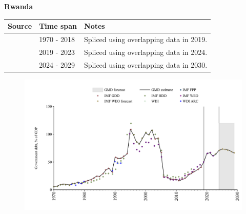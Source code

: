 \documentclass[12pt,a4paper,landscape]{article}
\begin{document}
\begin{adjustbox}{max totalsize={\paperwidth}{\paperheight},center}
\begin{minipage}[t][\textheight][t]{\textwidth}
\vspace*{0.5cm}
{}
\begin{center}
{\Large\bfseries Rwanda}
\end{center}
\vspace{0.5cm}
\begin{table}[H]
\centering
\small
\begin{tabular}{|l|l|l|}
\hline
\textbf{Source} & \textbf{Time span} & \textbf{Notes} \\
\hline
\rowcolor{white}\cite{IMF_GDD}& 1970 - 2018 &Spliced using overlapping data in 2019.\\
\rowcolor{lightgray}\cite{IMF_FPP}& 2019 - 2023 &Spliced using overlapping data in 2024.\\
\rowcolor{white}\cite{IMF_WEO_forecast}& 2024 - 2029 &Spliced using overlapping data in 2030.\\
\hline
\end{tabular}
\end{table}
\begin{figure}[H]
\centering
\includegraphics[width=\textwidth,height=0.6\textheight,keepaspectratio]{graphs/RWA_govdebt_GDP.pdf}
\end{figure}
\end{minipage}
\end{adjustbox}
\end{document}
